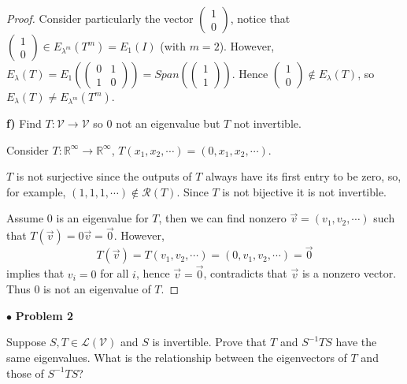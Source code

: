 \documentclass{article}
\begin{document}
\begin{proof}
Consider particularly the vector $\begin{pmatrix} 1 \\ 0 \end{pmatrix}$, notice that $\begin{pmatrix} 1 \\ 0 \end{pmatrix} \in E_{\lambda^m}(T^m) = E_1(I)$ (with $m=2$). However, $E_\lambda(T) = E_1( \begin{pmatrix} 0 & 1 \\ 1 & 0 \end{pmatrix}) = Span( \begin{pmatrix} 1 \\1 \end{pmatrix})$. Hence $\begin{pmatrix} 1 \\ 0 \end{pmatrix} \notin E_\lambda(T)$, so $E_\lambda(T) \ne E_{\lambda^m}(T^m)$.
\bigskip

\textbf{f)} Find $T: \mathcal{V} \to \mathcal{V}$ so 0 not an eigenvalue but $T$ not invertible.
\smallskip 

Consider $T: \mathbb{R}^\infty \to \mathbb{R}^\infty$, $T(x_1, x_2, \cdots)=(0,x_1, x_2 ,\cdots)$. 

$T$ is not surjective since the outputs of $T$ always have its first entry to be zero, so, for example, $(1,1,1,\cdots) \notin \mathcal{R}(T)$. Since $T$ is not bijective it is not invertible.

Assume 0 is an eigenvalue for $T$, then we can find nonzero $\vec{v} = (v_1,v_2, \cdots)$ such that $T(\vec{v}) = 0\vec{v} =\vec{0}$. However, 
$$T(\vec{v}) = T(v_1,v_2, \cdots) = (0, v_1,v_2,\cdots) = \vec{0}$$
implies that $v_i = 0$ for all $i$, hence $\vec{v} = \vec{0}$, contradicts that $\vec{v}$ is a nonzero vector. Thus 0 is not an eigenvalue of $T$.

\end{proof}

\newpage
$ \bullet$ \textbf{Problem 2}
\medskip

\begin{itshape}
Suppose $S,T\in \mathcal{L}(\mathcal{V})$ and $S$ is invertible. Prove that $T$ and $S^{-1}TS$ have the same eigenvalues. What is the relationship between the eigenvectors of $T$ and those of $S^{-1}TS$?
\end{itshape}
\medskip
\end{document}
